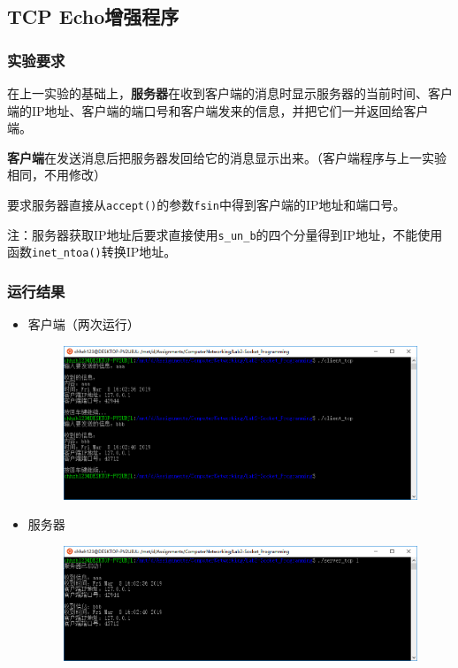 \documentclass[logo,reportComp]{thesis}
\begin{document}
\subsection{TCP Echo增强程序}
\subsubsection{实验要求}
在上一实验的基础上，\textbf{服务器}在收到客户端的消息时显示服务器的当前时间、客户端的IP地址、客户端的端口号和客户端发来的信息，并把它们一并返回给客户端。

\textbf{客户端}在发送消息后把服务器发回给它的消息显示出来。（客户端程序与上一实验相同，不用修改）

要求服务器直接从\verb'accept()'的参数\verb'fsin'中得到客户端的IP地址和端口号。

注：服务器获取IP地址后要求直接使用\verb's_un_b'的四个分量得到IP地址，不能使用函数\verb'inet_ntoa()'转换IP地址。

\subsubsection{运行结果}
\begin{itemize}
\item 客户端（两次运行）
\begin{figure}[H]
\centering
\includegraphics[width=0.8\linewidth]{fig/tcp-client-2.PNG}
\end{figure}
\item 服务器
\begin{figure}[H]
\centering
\includegraphics[width=0.8\linewidth]{fig/tcp-server-2.PNG}
\end{figure}
\end{itemize}
\end{document}
